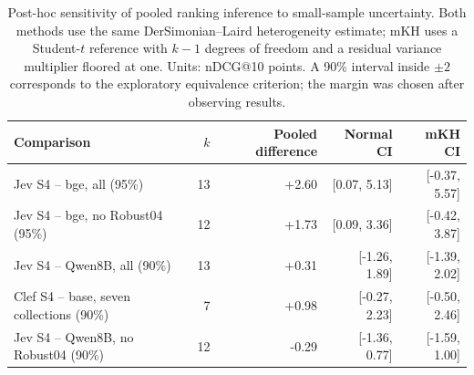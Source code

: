 \begin{table}[t]
\centering
\small
\caption{Post-hoc sensitivity of pooled ranking inference to small-sample uncertainty. Both methods use the same DerSimonian--Laird heterogeneity estimate; mKH uses a Student-$t$ reference with $k-1$ degrees of freedom and a residual variance multiplier floored at one. Units: nDCG@10 points. A 90\% interval inside $\pm2$ corresponds to the exploratory equivalence criterion; the margin was chosen after observing results.}
\label{tab:meta-sensitivity}
\begin{tabular}{lrrrr}
\toprule
Comparison & $k$ & Pooled difference & Normal CI & mKH CI \\
\midrule
Jev S4 -- bge, all (95\%) & 13 & +2.60 & [0.07, 5.13] & [-0.37, 5.57] \\
Jev S4 -- bge, no Robust04 (95\%) & 12 & +1.73 & [0.09, 3.36] & [-0.42, 3.87] \\
Jev S4 -- Qwen8B, all (90\%) & 13 & +0.31 & [-1.26, 1.89] & [-1.39, 2.02] \\
Clef S4 -- base, seven collections (90\%) & 7 & +0.98 & [-0.27, 2.23] & [-0.50, 2.46] \\
Jev S4 -- Qwen8B, no Robust04 (90\%) & 12 & -0.29 & [-1.36, 0.77] & [-1.59, 1.00] \\
\bottomrule
\end{tabular}
\end{table}
